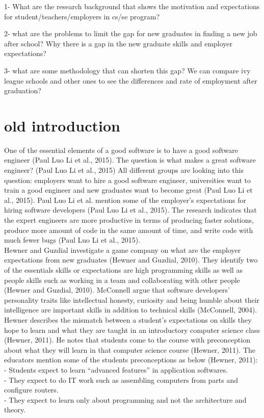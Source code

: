 \documentclass{sigchi}
\begin{document}
1- What are the research background that shows the motivation and expectations for student/teachers/employers in cs/se program?

2- what are the problems to limit the gap for new graduates in finding a new job after school? Why there is a gap in the new graduate skills and employer expectations?

3- what are some methodology that can shorten this gap? We can compare ivy league schools and other ones to see the differences and rate of employment after graduation?


\section{old introduction} 

One of the essential elements of a good software is to have a good software engineer (Paul Luo Li et al., 2015). The question is what makes a great software engineer? (Paul Luo Li et al., 2015) All different groups are looking into this question: employers want to hire a good software engineer, universities want to train a good engineer and new graduates want to become great (Paul Luo Li et al., 2015). Paul Luo Li et al. mention some of the employer’s expectations for hiring software developers (Paul Luo Li et al., 2015). The research indicates that the expert engineers are more productive in terms of producing faster solutions, produce more amount of code in the same amount of time, and write code with much fewer bugs (Paul Luo Li et al., 2015).\\ 
Hewner and Guzdial investigate a game company on what are the employer expectations from new graduates (Hewner and Guzdial, 2010). They identify two of the essentials skills or expectations are high programming skills as well as people skills such as working in a team and collaborating with other people (Hewner and Guzdial, 2010). McConnell argue that software developers’ personality traits like intellectual honesty, curiosity and being humble about their intelligence are important skills in addition to technical skills (McConnell, 2004). Hewner describes the mismatch between a student’s expectations on skills they hope to learn and what they are taught in an introductory computer science class (Hewner, 2011). He notes that students come to the course with preconception about what they will learn in that computer science course (Hewner, 2011). The educators mention some of the students preconceptions as below (Hewner, 2011):\\
	- Students expect to learn “advanced features” in application softwares.\\
	- They expect to do IT work such as assembling computers from parts and configure routers.\\
	- They expect to learn only about programming and not the architecture and theory.\\
\end{document}
